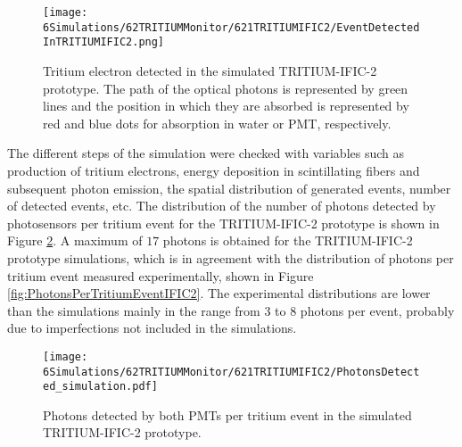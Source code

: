 \begin{figure}[hbtp]
\centering
\texttt{[image: 6Simulations/62TRITIUMMonitor/621TRITIUMIFIC2/EventDetectedInTRITIUMIFIC2.png]}
\caption{Tritium electron detected in the simulated TRITIUM-IFIC-2 prototype. The path of the optical photons is represented by green lines and the position in which they are absorbed is represented by red and blue dots for absorption in water or PMT, respectively.\label{fig:TritiumEventDetectedInSimulatedPrototype}}
\end{figure}
The different steps of the simulation were checked with variables such as production of tritium electrons, energy deposition in scintillating fibers and subsequent photon emission, the spatial distribution of generated events, number of detected events, etc. The distribution of the number of photons detected by photosensors per tritium event for the TRITIUM-IFIC-2 prototype is shown in Figure \ref{fig:SimulatedPhotonsDetected}. A maximum of $17$ photons is obtained for the TRITIUM-IFIC-2 prototype simulations, which is in agreement with the distribution of photons per tritium event measured experimentally, shown in Figure \ref{fig:PhotonsPerTritiumEventIFIC2}. The experimental distributions are lower than the simulations mainly in the range from $3$ to $8$ photons per event, probably due to imperfections not included in the simulations.

\begin{figure}[hbtp]
\centering
\texttt{[image: 6Simulations/62TRITIUMMonitor/621TRITIUMIFIC2/PhotonsDetected\_simulation.pdf]}
\caption{Photons detected by both PMTs per tritium event in the simulated TRITIUM-IFIC-2 prototype.\label{fig:SimulatedPhotonsDetected}}
\end{figure}

